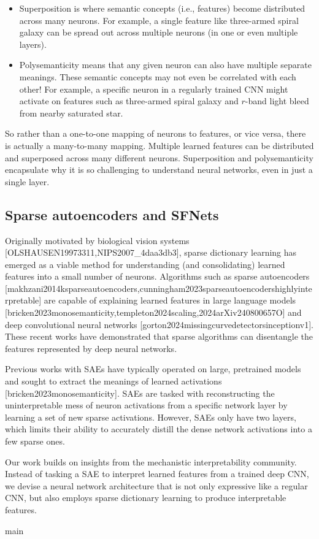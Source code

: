 \documentclass[11pt,a4paper]{article}
\begin{document}
\begin{itemize}
\item Superposition is where semantic concepts (i.e., features) become distributed across many neurons. For example, a single feature like three-armed spiral galaxy can be spread out across multiple neurons (in one or even multiple layers).
\item Polysemanticity means that any given neuron can also have multiple separate meanings. These semantic concepts may not even be correlated with each other! For example, a specific neuron in a regularly trained CNN might activate on features such as three-armed spiral galaxy and $r$-band light bleed from nearby saturated star.
\end{itemize}

So rather than a one-to-one mapping of neurons to features, or vice versa, there is actually a many-to-many mapping. Multiple learned features can be distributed and superposed across many different neurons. Superposition and polysemanticity encapsulate why it is so challenging to understand neural networks, even in just a single layer.

\subsection{Sparse autoencoders and SFNets}

Originally motivated by biological vision systems [OLSHAUSEN19973311,NIPS2007\_4daa3db3], sparse dictionary learning has emerged as a viable method for understanding (and consolidating) learned features into a small number of neurons. Algorithms such as sparse autoencoders [makhzani2014ksparseautoencoders,cunningham2023sparseautoencodershighlyinterpretable] are capable of explaining learned features in large language models [bricken2023monosemanticity,templeton2024scaling,2024arXiv240800657O] and deep convolutional neural networks [gorton2024missingcurvedetectorsinceptionv1]. These recent works have demonstrated that sparse algorithms can disentangle the features represented by deep neural networks.

Previous works with SAEs have typically operated on large, pretrained models and sought to extract the meanings of learned activations [bricken2023monosemanticity]. SAEs are tasked with reconstructing the uninterpretable mess of neuron activations from a specific network layer by learning a set of new sparse activations. However, SAEs only have two layers, which limits their ability to accurately distill the dense network activations into a few sparse ones.

Our work builds on insights from the mechanistic interpretability community. Instead of tasking a SAE to interpret learned features from a trained deep CNN, we devise a neural network architecture that is not only expressive like a regular CNN, but also employs sparse dictionary learning to produce interpretable features.

main
\end{document}
